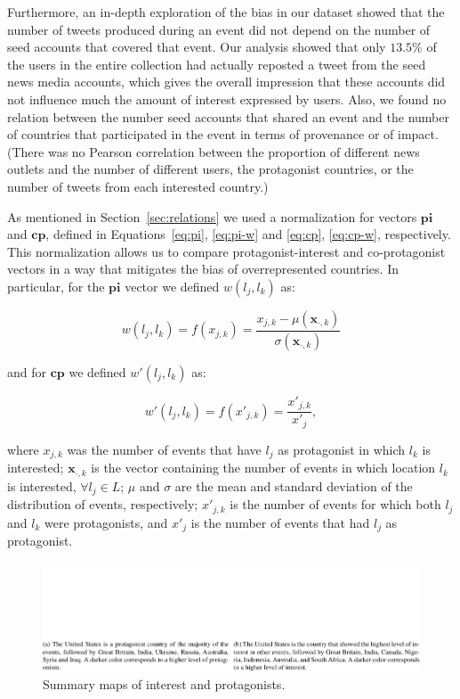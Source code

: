 
Furthermore, an in-depth exploration of the bias in our dataset showed that the
number of tweets produced during an event did not depend on the number of seed
accounts that covered that event. 
%
Our analysis showed that only $13.5\%$ of the users in the entire collection had
actually reposted a tweet from the seed news media accounts, which gives the
overall impression that these accounts did not influence much the amount of
interest expressed by users. 
%
Also, we found no relation between the number seed accounts that shared an event
and the number of countries that participated in the event in terms of
provenance or of impact. 
%
(There was no Pearson correlation between the proportion of different news
outlets and the number of different users, the protagonist countries, or the
number of tweets from each interested country.)


As mentioned in Section~\ref{sec:relations} we used a normalization for vectors
$\mathbf{pi}$ and $\mathbf{cp}$, defined in Equations~\ref{eq:pi}, \ref{eq:pi-w}
and \ref{eq:cp}, \ref{eq:cp-w}, respectively. 
%
This normalization allows us to compare protagonist-interest and co-protagonist
vectors in a way that mitigates the bias of overrepresented countries. 
%
In particular, for the $\mathbf{pi}$ vector we defined $w(l_j,l_k)$ as:

$$w(l_j, l_k) = f(x_{j,k})= \frac{x_{j,k} - \mu(\mathbf{x}_{\cdot,k})}{\sigma(\mathbf{x}_{\cdot,k})}$$

\noindent and for $\mathbf{cp}$ we defined $w'(l_j,l_k)$ as:

$$w'(l_j, l_k) = f(x'_{j,k})= \frac{x'_{j,k}}{x'_{j}},$$

\noindent where $x_{j,k}$ was the number of events that have $l_j$ as
protagonist in which $l_k$ is interested; $\mathbf{x}_{\cdot,k}$ is the vector
containing the number of events in which location $l_k$ is interested, $\forall
l_j \in L$; $\mu$ and $\sigma$ are the mean and standard deviation of the
distribution of events, respectively; $x'_{j,k}$ is the number of events for
which both $l_j$ and $l_k$ were protagonists, and $x'_{j}$ is the number of
events that had $l_j$ as protagonist.

\begin{figure}[t]
\centering
\includegraphics[width=\textwidth]{figures/geopolitical/choropleths.pdf}
\caption{Summary maps of interest and protagonists.}\label{fig:maps}
\end{figure}

